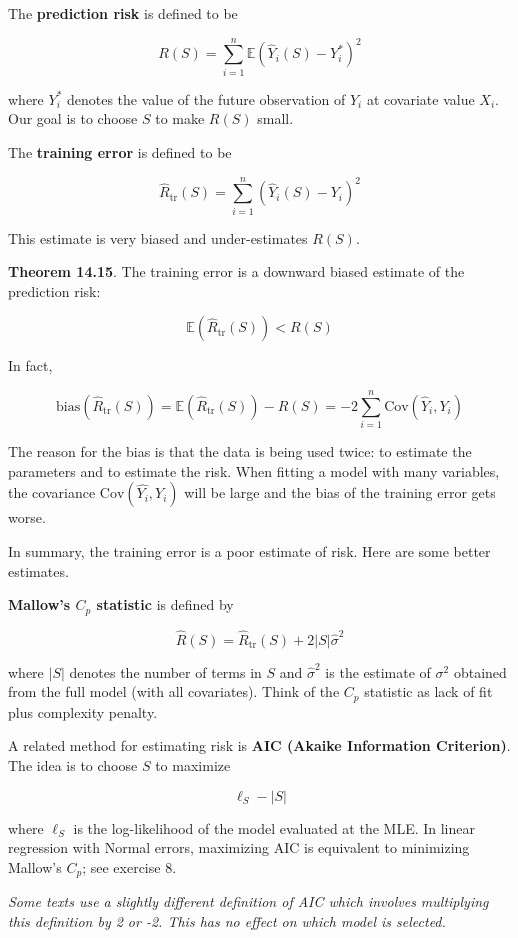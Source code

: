 The \textbf{prediction risk} is defined to be

\[R(S) = \sum_{i=1}^{n} \mathbb{E} (\hat{Y}_{i}(S) - Y_{i}^*)^{2} \]

where \(Y_{i}^*\) denotes the value of the future observation of \(Y_{i}\)
at covariate value \(X_{i}\). Our goal is to choose \(S\) to make \(R(S)\)
small.

The \textbf{training error} is defined to be

\[\hat{R}_\text{tr}(S) = \sum_{i=1}^{n} (\hat{Y}_{i}(S) - Y_{i})^{2} \]

This estimate is very biased and under-estimates \(R(S)\).

\textbf{Theorem 14.15}. The training error is a downward biased estimate
of the prediction risk:

\[ \mathbb{E}(\hat{R}_\text{tr}(S)) < R(S) \]

In fact,

\[\text{bias}(\hat{R}_\text{tr}(S)) = \mathbb{E}(\hat{R}_\text{tr}(S)) - R(S) = -2 \sum_{i=1}^{n} \text{Cov}(\hat{Y}_{i}, Y_{i})\]

The reason for the bias is that the data is being used twice: to
estimate the parameters and to estimate the risk. When fitting a model
with many variables, the covariance \(\text{Cov}(\hat{Y_{i}}, Y_{i})\) will
be large and the bias of the training error gets worse.

In summary, the training error is a poor estimate of risk. Here are some
better estimates.

\textbf{Mallow's \(C_p\) statistic} is defined by

\[\hat{R}(S) = \hat{R}_\text{tr}(S) + 2 |S| \hat{\sigma}^{2}\]

where \(|S|\) denotes the number of terms in \(S\) and
\(\hat{\sigma}^{2}\) is the estimate of \(\sigma^{2}\) obtained from the
full model (with all covariates). Think of the \(C_p\) statistic as lack
of fit plus complexity penalty.

A related method for estimating risk is \textbf{AIC (Akaike Information
Criterion)}. The idea is to choose \(S\) to maximize

\[ \ell_S - |S|\]

where \(\ell_S\) is the log-likelihood of the model evaluated at the
MLE. In linear regression with Normal errors, maximizing AIC is
equivalent to minimizing Mallow's \(C_p\); see exercise 8.

\emph{Some texts use a slightly different definition of AIC which
involves multiplying this definition by 2 or -2. This has no effect on
which model is selected.}

